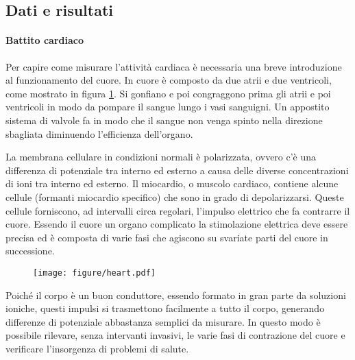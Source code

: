 \subsection{Dati e risultati}

\paragraph{Battito cardiaco}

Per capire come misurare l'attività cardiaca è necessaria una breve introduzione
al funzionamento del cuore. In cuore è composto da due atrii e due ventricoli,
come mostrato in figura \ref{fig:heart7}. Si gonfiano e poi congraggono prima gli atrii e poi ventricoli
in modo da pompare il sangue lungo i vasi sanguigni. Un appostito sistema di valvole
fa in modo che il sangue non venga spinto nella direzione sbagliata diminuendo l'efficienza
dell'organo.

La membrana cellulare in condizioni normali è polarizzata, ovvero c'è una differenza di potenziale
tra interno ed esterno a causa delle diverse concentrazioni di ioni tra interno ed esterno. Il miocardio, o muscolo cardiaco,
contiene alcune cellule (formanti miocardio specifico) che sono in grado di depolarizzarsi. Queste cellule
forniscono, ad intervalli circa regolari, l'impulso elettrico che fa contrarre il cuore.
Essendo il cuore un organo complicato la stimolazione elettrica deve essere precisa ed è composta
di varie fasi che agiscono su svariate parti del cuore in successione.

\begin{figure}
    \centering
	\texttt{[image: figure/heart.pdf]}
	\caption{}
	\label{fig:heart7}
\end{figure}

Poiché il corpo è un buon conduttore, essendo formato in gran parte da soluzioni ioniche, questi impulsi
si trasmettono facilmente a tutto il corpo, generando differenze di potenziale abbastanza semplici
da misurare. In questo modo è possibile rilevare, senza intervanti invasivi, le varie fasi di contrazione
del cuore e verificare l'insorgenza di problemi di salute.

